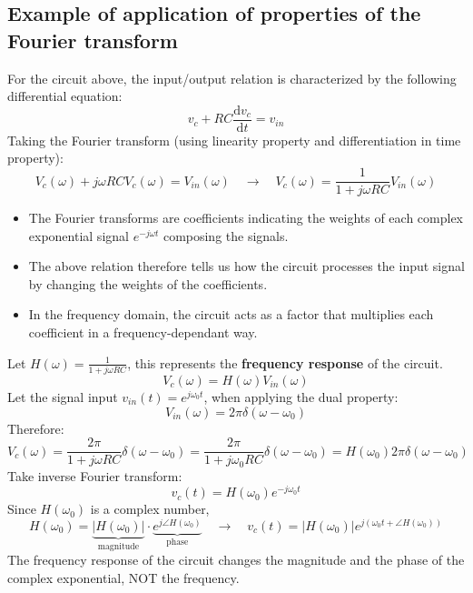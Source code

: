 \subsection{Example of application of properties of the Fourier transform}

\begin{ex}{}
\begin{figure}[H] 
    \centering
\end{figure}

For the circuit above, the input/output relation is characterized by the following differential equation:
\[ 
v_{c}+RC \frac{\mathrm{d} v_{c}}{\mathrm{d}t} = v_{in} 
\]
Taking the Fourier transform (using linearity property and differentiation in time property):
\[ 
V_{c}(\omega) + j\omega RC V_{c}(\omega) = V_{in}(\omega) \quad \to \quad V_{c}(\omega) = \frac{1}{1+j\omega RC}V_{in}(\omega) 
\]

\begin{itemize}
    \item The Fourier transforms are coefficients indicating the weights of each complex exponential signal $e^{-j \omega t}$ composing the signals. 
    
    \item The above relation therefore tells us how the circuit processes the input signal by changing the weights of the coefficients. 
    
    \item In the frequency domain, the circuit acts as a factor that multiplies each coefficient in a frequency-dependant way.
\end{itemize}

Let $H(\omega) = \frac{1}{1+j\omega RC}$, this represents the \textbf{frequency response} of the circuit.
\[ 
V_{c}(\omega) =H(\omega) V_{in}(\omega) 
\]
Let the signal input $v_{in}(t)=e^{j\omega_{0}t}$, when applying the dual property:
\[ 
V_{in}(\omega) = 2\pi \delta(\omega-\omega_{0}) 
\]
Therefore:
\[ 
V_{c}(\omega) 
= \frac{2 \pi}{1+j\omega RC}\delta(\omega-\omega_{0}) 
= \frac{2 \pi}{1+j\omega_{0} RC}\delta(\omega-\omega_{0}) 
= H(\omega_{0}) 2\pi\delta(\omega-\omega_{0}) 
\]
Take inverse Fourier transform:
\[ 
v_{c}(t) = H(\omega_{0})e^{-j\omega_{0} t} 
\]
Since $H(\omega_{0})$ is a complex number, 
\[ 
H(\omega_{0}) 
=\underbrace{\lvert H(\omega_{0}) \rvert}_{\text{magnitude}}\cdot \underbrace{e^{j \angle H(\omega_{0})}}_{\text{phase}} 
\quad \to \quad  \boxed{v_{c}(t) 
= \lvert H(\omega_{0}) \rvert  e^{j(\omega_{0} t+ \angle H(\omega_{0}))}}
\]
The frequency response of the circuit changes the magnitude and the phase of the complex exponential, NOT the frequency.


\end{ex}
